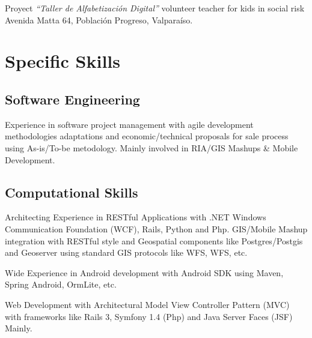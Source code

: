 \documentclass[11pt,letterpaper,roman]{moderncv}
\begin{document}
	 {\tchr} {\ernestoquiroz } {\valpo} {}
	{Proyect \textit{``Taller de Alfabetizaci\'on Digital''} volunteer
	teacher for kids in social risk Avenida Matta 64, Poblaci\'on Progreso,
	Valpara\'iso.}
	
%

 

\section{Specific Skills}
\subsection{Software Engineering}
	{Experience in software project management with agile development
methodologies adaptations and economic/technical proposals for sale process
using As-is/To-be metodology. Mainly involved in RIA/GIS Mashups \& Mobile Development.}
	
\subsection{Computational Skills}

	{Architecting Experience in RESTful Applications with .NET Windows
Communication Foundation (WCF), Rails, Python and Php. GIS/Mobile Mashup
integration with RESTful style and Geospatial components like Postgres/Postgis
and Geoserver using standard GIS protocols like WFS, WFS, etc.}

 {Wide Experience in Android development with Android
SDK using Maven, Spring Android, OrmLite, etc.}

 {Web Development with Architectural Model View
Controller Pattern (MVC) with frameworks like Rails 3, Symfony 1.4 (Php) and
Java Server Faces (JSF) Mainly.}
\end{document}
